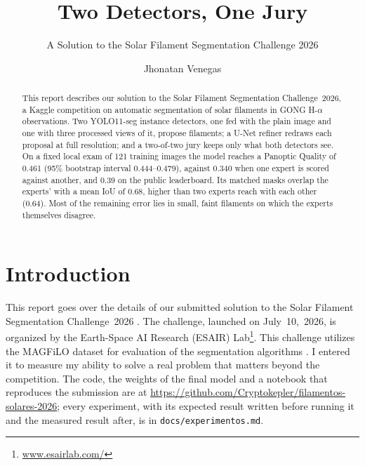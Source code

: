 \documentclass[sigconf]{acmart}
\begin{document}
\title{Two Detectors, One Jury}  %
\subtitle{A Solution to the Solar Filament Segmentation Challenge 2026} %


\author{Jhonatan Venegas}

\begin{abstract}
    This report describes our solution to the Solar Filament Segmentation Challenge~2026, a Kaggle competition on automatic segmentation of solar filaments in GONG H-$\alpha$ observations. Two YOLO11-seg instance detectors, one fed with the plain image and one with three processed views of it, propose filaments; a U-Net refiner redraws each proposal at full resolution; and a two-of-two jury keeps only what both detectors see. On a fixed local exam of 121 training images the model reaches a Panoptic Quality of 0.461 (95\% bootstrap interval 0.444--0.479), against 0.340 when one expert is scored against another, and 0.39 on the public leaderboard. Its matched masks overlap the experts' with a mean IoU of 0.68, higher than two experts reach with each other (0.64). Most of the remaining error lies in small, faint filaments on which the experts themselves disagree.
\end{abstract}

\maketitle

\section{Introduction}
    This report goes over the details of our submitted solution to the Solar Filament Segmentation Challenge~2026 \cite{filament-segmentation-2026}. The challenge, launched on July~10,~2026, is organized by the Earth-Space AI Research (ESAIR) Lab\footnote{\href{https://www.esairlab.com/home}{www.esairlab.com/}}. This challenge utilizes the MAGFiLO dataset for evaluation of the segmentation algorithms \cite{ahmadzadeh2024dataset}. I entered it to measure my ability to solve a real problem that matters beyond the competition. The code, the weights of the final model and a notebook that reproduces the submission are at \url{https://github.com/Cryptokepler/filamentos-solares-2026}; every experiment, with its expected result written before running it and the measured result after, is in \texttt{docs/experimentos.md}.
\end{document}
